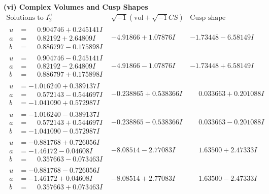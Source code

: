 \documentclass[1p]{elsarticle_modified}
\theoremstyle{definition}
\newcommand{\I}{\sqrt{-1}}
\begin{document}
\newpage\flushleft \textbf{(vi) Complex Volumes and Cusp Shapes}
$$\begin{array}{c|c|c}  
\text{Solutions to }I^u_{2}& \I (\text{vol} + \sqrt{-1}CS) & \text{Cusp shape}\\
 \hline 
\begin{aligned}
u &= \phantom{-}0.904746 + 0.245141 I \\
a &= \phantom{-}0.82192 + 2.64809 I \\
b &= \phantom{-}0.886797 - 0.175898 I\end{aligned}
 & -4.91866 + 1.07876 I & -1.73448 - 6.58149 I \\ \hline\begin{aligned}
u &= \phantom{-}0.904746 - 0.245141 I \\
a &= \phantom{-}0.82192 - 2.64809 I \\
b &= \phantom{-}0.886797 + 0.175898 I\end{aligned}
 & -4.91866 - 1.07876 I & -1.73448 + 6.58149 I \\ \hline\begin{aligned}
u &= -1.016240 + 0.389137 I \\
a &= \phantom{-}0.572143 - 0.544697 I \\
b &= -1.041090 + 0.572987 I\end{aligned}
 & -0.238865 + 0.538366 I & \phantom{-}0.033663 + 0.201088 I \\ \hline\begin{aligned}
u &= -1.016240 - 0.389137 I \\
a &= \phantom{-}0.572143 + 0.544697 I \\
b &= -1.041090 - 0.572987 I\end{aligned}
 & -0.238865 - 0.538366 I & \phantom{-}0.033663 - 0.201088 I \\ \hline\begin{aligned}
u &= -0.881768 + 0.726056 I \\
a &= -1.46172 - 0.04608 I \\
b &= \phantom{-}0.357663 - 0.073463 I\end{aligned}
 & -8.08514 - 2.77083 I & \phantom{-}1.63500 + 2.47333 I \\ \hline\begin{aligned}
u &= -0.881768 - 0.726056 I \\
a &= -1.46172 + 0.04608 I \\
b &= \phantom{-}0.357663 + 0.073463 I\end{aligned}
 & -8.08514 + 2.77083 I & \phantom{-}1.63500 - 2.47333 I \\ \hline\begin{aligned}

\end{aligned}
\end{array}$$
\end{document}
